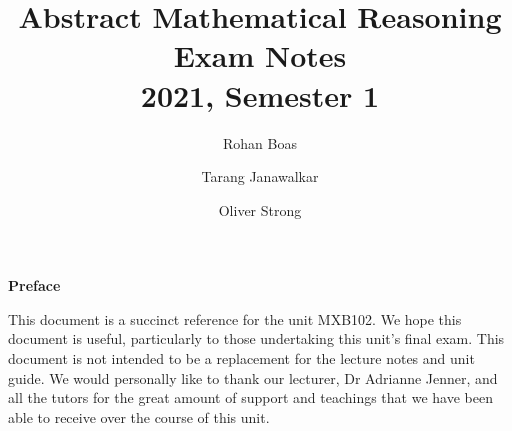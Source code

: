 \documentclass{article}
\title{\textbf{Abstract Mathematical Reasoning}
    \texorpdfstring{\\}{ } {\large Exam Notes}
    \texorpdfstring{\\}{ } {\normalsize 2021, Semester 1}}
\author{
    Rohan Boas \and Tarang Janawalkar \and Oliver Strong
}
\date{}
\begin{document}
%
\begin{titlepage}
    \maketitle
    \thispagestyle{empty}
    \vspace*{\fill}
    \begin{adjustwidth}{4cm}{4cm}
        {\Large\bf Preface}
        \vspace{0.7em}

        This document is a succinct reference for the unit MXB102.
        We hope this document is useful, particularly to those undertaking this unit's final exam.
        This document is not intended to be a replacement for the lecture notes and unit guide.
        We would personally like to thank our lecturer, Dr Adrianne Jenner,
        and all the tutors for the great amount of support and teachings
        that we have been able to receive over the course of this unit.
    \end{adjustwidth}
    \vspace*{\fill}
    \doclicenseThis
    \thispagestyle{empty}
\end{titlepage}
%
\newpage
%
\end{document}
